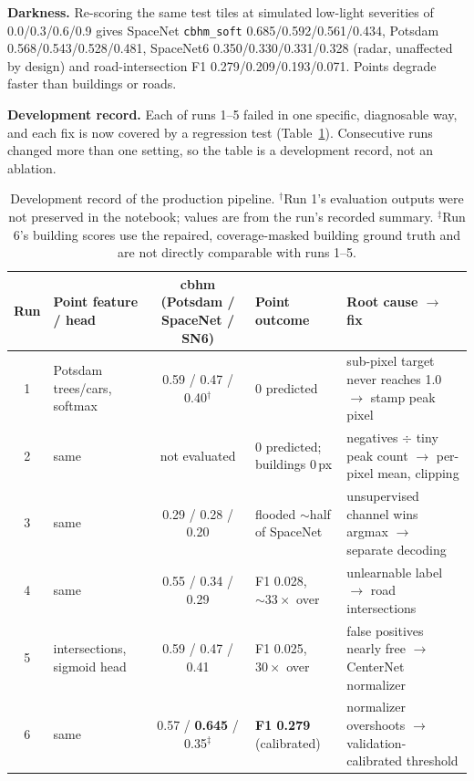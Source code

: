 \textbf{Darkness.} Re-scoring the same test tiles at simulated low-light severities of
0.0/0.3/0.6/0.9 gives SpaceNet \texttt{cbhm\_soft} 0.685/0.592/0.561/0.434, Potsdam
0.568/0.543/0.528/0.481, SpaceNet6 0.350/0.330/0.331/0.328 (radar, unaffected by design) and
road-intersection F1 0.279/0.209/0.193/0.071. Points degrade faster than buildings or roads.

\textbf{Development record.} Each of runs 1--5 failed in one specific, diagnosable way, and each
fix is now covered by a regression test (Table~\ref{tab:scaled-history}). Consecutive runs changed
more than one setting, so the table is a development record, not an ablation.

\begin{table}
  \caption{Development record of the production pipeline. $^\dagger$Run 1's evaluation outputs were
  not preserved in the notebook; values are from the run's recorded summary. $^\ddagger$Run 6's
  building scores use the repaired, coverage-masked building ground truth and are not directly
  comparable with runs 1--5.}
  \label{tab:scaled-history}
  \small
  \begin{tabular}{@{}c p{} c p{} p{}@{}}
    \toprule
    Run & Point feature / head & cbhm (Potsdam / SpaceNet / SN6) & Point outcome & Root cause $\to$ fix \\
    \midrule
    1 & Potsdam trees/cars, softmax & 0.59 / 0.47 / 0.40$^\dagger$ & 0 predicted &
      sub-pixel target never reaches 1.0 $\to$ stamp peak pixel \\
    2 & same & not evaluated & 0 predicted; buildings 0\,px &
      negatives $\div$ tiny peak count $\to$ per-pixel mean, clipping \\
    3 & same & 0.29 / 0.28 / 0.20 & flooded ${\sim}$half of SpaceNet &
      unsupervised channel wins argmax $\to$ separate decoding \\
    4 & same & 0.55 / 0.34 / 0.29 & F1 0.028, ${\sim}33\times$ over &
      unlearnable label $\to$ road intersections \\
    5 & intersections, sigmoid head & 0.59 / 0.47 / 0.41 & F1 0.025, $30\times$ over &
      false positives nearly free $\to$ CenterNet normalizer \\
    6 & same & 0.57 / \textbf{0.645} / 0.35$^\ddagger$ & \textbf{F1 0.279} (calibrated) &
      normalizer overshoots $\to$ validation-calibrated threshold \\
    \bottomrule
  \end{tabular}
\end{table}

